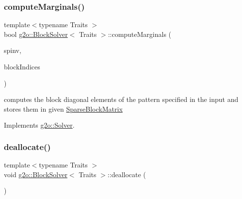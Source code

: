 \mbox{\label{classg2o_1_1_block_solver_ac21cd7e2c9b8a1414f7a2dccb0d30a0e}} 
\subsubsection{\texorpdfstring{compute\+Marginals()}{computeMarginals()}}
{\footnotesize\ttfamily template$<$typename Traits $>$ \\
bool \mbox{\hyperlink{classg2o_1_1_block_solver}{g2o\+::\+Block\+Solver}}$<$ Traits $>$\+::compute\+Marginals (\begin{DoxyParamCaption}\item[{\mbox{\hyperlink{classg2o_1_1_sparse_block_matrix}{Sparse\+Block\+Matrix}}$<$ Matrix\+Xd $>$ \&}]{spinv,  }\item[{const std\+::vector$<$ std\+::pair$<$ int, int $>$ $>$ \&}]{block\+Indices }\end{DoxyParamCaption})\hspace{0.3cm}{\ttfamily [virtual]}}

computes the block diagonal elements of the pattern specified in the input and stores them in given \mbox{\hyperlink{classg2o_1_1_sparse_block_matrix}{Sparse\+Block\+Matrix}} 

Implements \mbox{\hyperlink{classg2o_1_1_solver_afc33768e6c024e11d9e3c9d938b59b7f}{g2o\+::\+Solver}}.

\mbox{\label{classg2o_1_1_block_solver_a1877467844b7b9ab51bd6600e3a93eb0}} 
\subsubsection{\texorpdfstring{deallocate()}{deallocate()}}
{\footnotesize\ttfamily template$<$typename Traits $>$ \\
void \mbox{\hyperlink{classg2o_1_1_block_solver}{g2o\+::\+Block\+Solver}}$<$ Traits $>$\+::deallocate (\begin{DoxyParamCaption}{ }\end{DoxyParamCaption})\hspace{0.3cm}{\ttfamily [protected]}}

